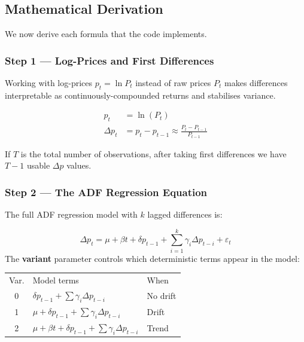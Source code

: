 \documentclass[10pt,a4paper,twocolumn]{article}
\begin{document}
\subsection{Mathematical Derivation}

We now derive each formula that the code implements.

\subsubsection{Step 1 --- Log-Prices and First Differences}

Working with log-prices $p_t = \ln P_t$ instead of raw prices $P_t$
makes differences interpretable as continuously-compounded returns
and stabilises variance.

\begin{tcolorbox}[mathbox={Formula 1}]
\vspace{-4pt}
\begin{align}
  p_t &= \ln(P_t) \label{eq:logp}\\
  \Delta p_t &= p_t - p_{t-1} \approx \frac{P_t - P_{t-1}}{P_{t-1}}
  \label{eq:diff}
\end{align}
\vspace{-6pt}
\end{tcolorbox}

If $T$ is the total number of observations, after taking first
differences we have $T-1$ usable $\Delta p$ values.

\subsubsection{Step 2 --- The ADF Regression Equation}

The full ADF regression model with $k$ lagged differences is:

\begin{tcolorbox}[mathbox={Formula 2 --- ADF Regression}]
\vspace{-4pt}
\begin{equation}\label{eq:adf}
  \Delta p_t = \mu + \beta t + \delta p_{t-1}
             + \sum_{i=1}^{k}\gamma_i \Delta p_{t-i} + \varepsilon_t
\end{equation}
\vspace{-3pt}
The \textbf{variant} parameter controls which deterministic terms
appear in the model:
\vspace{2pt}
\begin{center}
\small
\begin{tabular}{@{}cp{2.9cm}p{1.6cm}@{}}
Var. & Model terms & When\\
0 & $\delta p_{t-1} + \sum\gamma_i\Delta p_{t-i}$ & No drift\\
1 & $\mu + \delta p_{t-1} + \sum\gamma_i\Delta p_{t-i}$ & Drift\\
2 & $\mu+\beta t + \delta p_{t-1}+\sum\gamma_i\Delta p_{t-i}$ & Trend\\
\end{tabular}
\end{center}
\vspace{-2pt}
\end{tcolorbox}
\end{document}
